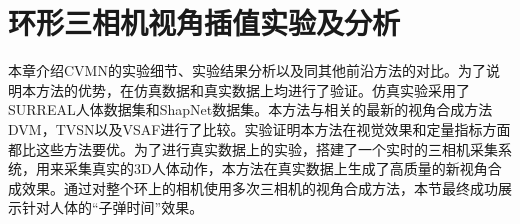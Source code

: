 \chapter{环形三相机视角插值实验及分析}\label{chap:CVM_experiment}

本章介绍CVMN的实验细节、实验结果分析以及同其他前沿方法的对比。为了说明本方法的优势，在仿真数据和真实数据上均进行了验证。仿真实验采用了SURREAL人体数据集\citep{varol2017}和ShapNet数据集\citep{shapenet2015}。本方法与相关的最新的视角合成方法DVM\citep{Ji_2017_CVPR}，TVSN\citep{tvsn_cvpr2017}以及VSAF\citep{zhou2016view}进行了比较。实验证明本方法在视觉效果和定量指标方面都比这些方法要优。为了进行真实数据上的实验，搭建了一个实时的三相机采集系统，用来采集真实的3D人体动作，本方法在真实数据上生成了高质量的新视角合成效果。通过对整个环上的相机使用多次三相机的视角合成方法，本节最终成功展示针对人体的“子弹时间”效果。

